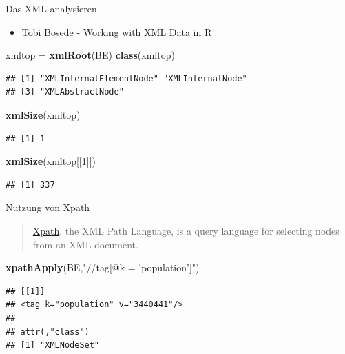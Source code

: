 \documentclass[ignorenonframetext,]{beamer}
\newenvironment{Shaded}{\begin{snugshade}}{\end{snugshade}}
\newcommand{\DecValTok}[1]{\textcolor[rgb]{0.00,0.00,0.81}{#1}}
\newcommand{\KeywordTok}[1]{\textcolor[rgb]{0.13,0.29,0.53}{\textbf{#1}}}
\newcommand{\NormalTok}[1]{#1}
\newcommand{\StringTok}[1]{\textcolor[rgb]{0.31,0.60,0.02}{#1}}
\providecommand{\tightlist}{%
  \setlength{\itemsep}{0pt}\setlength{\parskip}{0pt}}
\begin{document}
\begin{frame}[fragile]{Das XML analysieren}
\protect\hypertarget{das-xml-analysieren}{}

\begin{itemize}
\tightlist
\item
  \href{http://www.informit.com/articles/article.aspx?p=2215520}{Tobi
  Bosede - Working with XML Data in R}
\end{itemize}

\begin{Shaded}
\begin{Highlighting}[]
\NormalTok{xmltop =}\StringTok{ }\KeywordTok{xmlRoot}\NormalTok{(BE)}
\KeywordTok{class}\NormalTok{(xmltop)}
\end{Highlighting}
\end{Shaded}

\begin{verbatim}
## [1] "XMLInternalElementNode" "XMLInternalNode"       
## [3] "XMLAbstractNode"
\end{verbatim}

\begin{Shaded}
\begin{Highlighting}[]
\KeywordTok{xmlSize}\NormalTok{(xmltop)}
\end{Highlighting}
\end{Shaded}

\begin{verbatim}
## [1] 1
\end{verbatim}

\begin{Shaded}
\begin{Highlighting}[]
\KeywordTok{xmlSize}\NormalTok{(xmltop[[}\DecValTok{1}\NormalTok{]])}
\end{Highlighting}
\end{Shaded}

\begin{verbatim}
## [1] 337
\end{verbatim}

\end{frame}

\begin{frame}[fragile]{Nutzung von Xpath}
\protect\hypertarget{nutzung-von-xpath}{}

\begin{quote}
\href{https://de.wikipedia.org/wiki/XPath}{Xpath}, the XML Path
Language, is a query language for selecting nodes from an XML document.
\end{quote}

\begin{Shaded}
\begin{Highlighting}[]
\KeywordTok{xpathApply}\NormalTok{(BE,}\StringTok{"//tag[@k = 'population']"}\NormalTok{)}
\end{Highlighting}
\end{Shaded}

\begin{verbatim}
## [[1]]
## <tag k="population" v="3440441"/> 
## 
## attr(,"class")
## [1] "XMLNodeSet"
\end{verbatim}

\end{frame}
\end{document}

